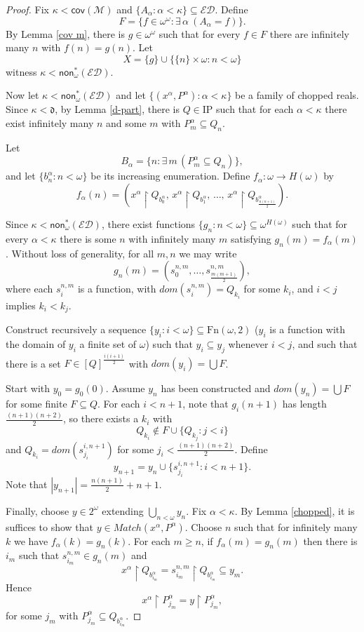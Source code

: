 \documentclass{amsart}
\theoremstyle{definition}
\theoremstyle{remark}
\numberwithin{equation}{section}
\newcommand{\non}{\mathsf{non}}
\newcommand{\cov}{\mathsf{cov}}
\newcommand{\ed}{\mathcal{E}\mathcal{D}}
\begin{document}
\begin{proof}

    Fix $\kappa < \cov(\mathcal{M})$ and $\{A_\alpha : \alpha < \kappa\} \subseteq \ed$. 
Define 
\[
F=\{ f \in \omega^\omega : \exists\, \alpha \ (A_\alpha = f)\}.
\]
By Lemma \ref{cov m}, there is $g \in \omega^\omega$ such that for every $f \in F$ there are infinitely many $n$ with $f(n)=g(n)$.
Let 
\[
X=\{g\}\cup\bigl\{\{n\}\times\omega : n<\omega\bigr\}
\]
witness $\kappa<\non^*_\omega(\ed)$.

Now let $\kappa<\non^*_\omega(\ed)$ and let $\{(x^\alpha,P^\alpha): \alpha<\kappa\}$ be a family of chopped reals.  
Since $\kappa<\mathfrak{d}$, by Lemma \ref{d-part}, there is $Q\in \mathrm{IP}$ such that for each $\alpha<\kappa$ there exist infinitely many $n$ and some $m$ with $P^\alpha_m\subseteq Q_n$.  

Let
\[
B_\alpha=\{n : \exists\, m \, (P^\alpha_m \subseteq Q_n)\},
\]
and let $\{b_n^\alpha : n<\omega\}$ be its increasing enumeration.  
Define $f_\alpha:\omega\to H(\omega)$ by
\[
f_\alpha(n)=(x^\alpha\!\upharpoonright Q_{b_0^\alpha},\, x^\alpha\!\upharpoonright Q_{b_1^\alpha},\, \dots ,\, x^\alpha\!\upharpoonright Q_{b_{\frac{n(n+1)}2}^\alpha}).
\]

Since $\kappa<\non^*_\omega(\ed)$, there exist functions $\{g_n:n<\omega\}\subseteq \omega^{H(\omega)}$ such that for every $\alpha<\kappa$ there is some $n$ with infinitely many $m$ satisfying $g_n(m)=f_\alpha(m)$.  
Without loss of generality, for all $m,n$ we may write
\[
g_n(m)=( s^{n,m}_0,\dots,s^{n,m}_{\frac{m(m+1)}2}),
\]
where each $s^{n,m}_i$ is a function, with $dom(s^{n,m}_i)=Q_{k_i}$ for some $k_i$, and $i<j$ implies $k_i<k_j$.

Construct recursively a sequence $\{y_i:i<\omega\}\subseteq \mathrm{Fn}(\omega,2)$ ($y_i$ is a function with the domain of $y_i$ a finite set of $\omega$)  such that $y_i\subseteq y_j$ whenever $i<j$, and such that there is a set $F\in[Q]^{\frac{i(i+1)}2}$ with $dom(y_i)=\bigcup F$.

Start with $y_0=g_0(0)$. Assume $y_n$ has been constructed and $dom(y_n)=\bigcup F$ for some finite $F\subseteq Q$. For each $i<n+1$, note that $g_i(n+1)$ has length $\frac{(n+1)(n+2)}2$, so there exists a $k_i$ with 
\[
Q_{k_i}\notin F\cup\{Q_{k_j}:j<i\}
\]
and $Q_{k_i}=dom(s^{i,n+1}_{j_i})$ for some $j_i<\frac{(n+1)(n+2)}2$.  
Define
\[
y_{n+1}=y_n\cup\{s^{i,n+1}_{j_i}:i<n+1\}.
\]
Note that $|y_{n+1}|=\frac{n(n+1)}2+n+1$.

Finally, choose $y\in 2^\omega$ extending $\bigcup_{n<\omega} y_n$.  
Fix $\alpha<\kappa$. By Lemma \ref{chopped}, it is suffices to show that $y\in Match(x^\alpha,P^\alpha)$.  
Choose $n$ such that for infinitely many $k$ we have $f_\alpha(k)=g_n(k)$.  
For each $m\ge n$, if $f_\alpha(m)=g_n(m)$ then there is $i_m$ such that  
$s^{n,m}_{i_m}\in g_n(m)$ and
\[
x^\alpha\!\upharpoonright Q_{b^\alpha_{i_m}}
 = s^{n,m}_{i_m}\!\upharpoonright Q_{b^\alpha_{i_m}}
 \subseteq y_m.
\]
Hence
\[
x^\alpha\!\upharpoonright P^\alpha_{j_m}
= y\!\upharpoonright P^\alpha_{j_m},
\]
for some $j_m$ with $P^\alpha_{j_m}\subseteq Q_{b^\alpha_{i_m}}$.
    \end{proof}
\end{document}
